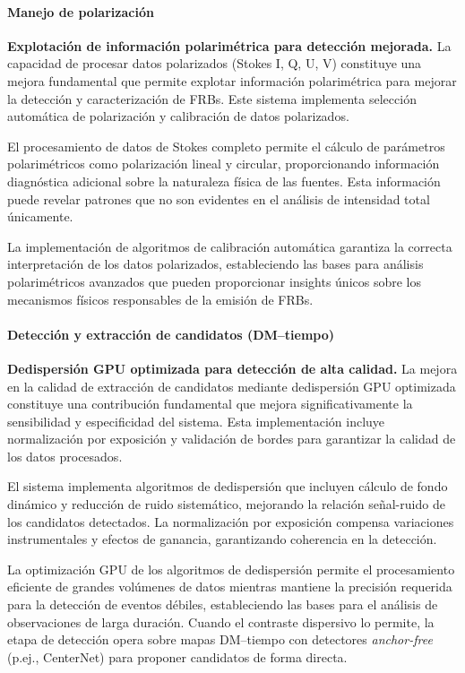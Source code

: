 \paragraph{Manejo de polarización}

\noindent\textbf{Explotación de información polarimétrica para detección mejorada.} La capacidad de procesar datos polarizados (Stokes I, Q, U, V) constituye una mejora fundamental que permite explotar información polarimétrica para mejorar la detección y caracterización de FRBs. Este sistema implementa selección automática de polarización y calibración de datos polarizados.

El procesamiento de datos de Stokes completo permite el cálculo de parámetros polarimétricos como polarización lineal y circular, proporcionando información diagnóstica adicional sobre la naturaleza física de las fuentes. Esta información puede revelar patrones que no son evidentes en el análisis de intensidad total únicamente.

La implementación de algoritmos de calibración automática garantiza la correcta interpretación de los datos polarizados, estableciendo las bases para análisis polarimétricos avanzados que pueden proporcionar insights únicos sobre los mecanismos físicos responsables de la emisión de FRBs.

\paragraph{Detección y extracción de candidatos (DM--tiempo)}

\noindent\textbf{Dedispersión GPU optimizada para detección de alta calidad.} La mejora en la calidad de extracción de candidatos mediante dedispersión GPU optimizada constituye una contribución fundamental que mejora significativamente la sensibilidad y especificidad del sistema. Esta implementación incluye normalización por exposición y validación de bordes para garantizar la calidad de los datos procesados.

El sistema implementa algoritmos de dedispersión que incluyen cálculo de fondo dinámico y reducción de ruido sistemático, mejorando la relación señal-ruido de los candidatos detectados. La normalización por exposición compensa variaciones instrumentales y efectos de ganancia, garantizando coherencia en la detección.

La optimización GPU de los algoritmos de dedispersión permite el procesamiento eficiente de grandes volúmenes de datos mientras mantiene la precisión requerida para la detección de eventos débiles, estableciendo las bases para el análisis de observaciones de larga duración. Cuando el contraste dispersivo lo permite, la etapa de detección opera sobre mapas DM--tiempo con detectores \emph{anchor-free} (p.ej., CenterNet) para proponer candidatos de forma directa.

